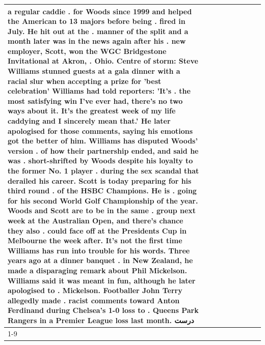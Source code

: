 \begin{table}[H]
\begin{tabular}{lllrlllll}
a regular caddie . for Woods since 1999 and helped the American to 13 majors before being . fired in July. He hit out at the . manner of the split and a month later was in the news again after his . new employer, Scott, won the WGC Bridgestone Invitational at Akron, . Ohio. Centre of storm: Steve Williams stunned guests at a gala dinner with a racial slur when accepting a prize for 'best celebration' Williams had told reporters: 'It's . the most satisfying win I've ever had, there's no two ways about it. It's the greatest week of my life caddying and I sincerely mean that.' He later apologised for those comments, saying his emotions got the better of him. Williams has disputed Woods' version . of how their partnership ended, and said he was . short-shrifted by Woods despite his loyalty to the former No. 1 player . during the sex scandal that derailed his career. Scott is today preparing for his third round . of the HSBC Champions. He is . going for his second World Golf Championship of the year. Woods and Scott are to be in the same . group next week at the Australian Open, and there's chance they also . could face off at the Presidents Cup in Melbourne the week after. It's not the first time Williams has run into trouble for his words. Three years ago at a dinner banquet . in New Zealand, he made a disparaging remark about Phil Mickelson. Williams said it was meant in fun, although he later apologised to . Mickelson. Footballer John Terry allegedly made . racist comments toward Anton Ferdinand during Chelsea's 1-0 loss to . Queens Park Rangers in a Premier League loss last month. درست \\
\cline{1-9}

\end{tabular}
\end{table}
